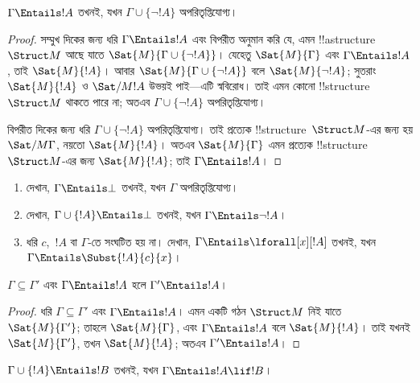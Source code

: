\documentclass[../../../include/open-logic-section]{subfiles}
\begin{document}
\begin{prop}
$\Gamma \Entails !A$ তখনই, যখন $\Gamma \cup \{\lnot !A\}$
অপরিতৃপ্তিযোগ্য।
\end{prop}

\begin{proof}
সম্মুখ দিকের জন্য ধরি $\Gamma \Entails !A$ এবং বিপরীত অনুমান করি যে,
এমন !!a{structure}~$\Struct M$ আছে যাতে $\Sat{M}{\Gamma
  \cup \{ \lnot !A \}}$। যেহেতু $\Sat{M}{\Gamma}$ এবং
$\Gamma \Entails !A$, তাই $\Sat{M}{!A}$। আবার
$\Sat{M}{\Gamma\cup \{ \lnot !A \}}$ বলে $\Sat{M}{\lnot !A}$;
সুতরাং $\Sat{M}{!A}$ ও $\Sat/{M}{!A}$ উভয়ই পাই—এটি স্ববিরোধ। তাই
এমন কোনো !!{structure}~$\Struct M$ থাকতে পারে না; অতএব
$\Gamma \cup \{ \lnot !A \}$ অপরিতৃপ্তিযোগ্য।

বিপরীত দিকের জন্য ধরি $\Gamma \cup \{ \lnot !A \}$
অপরিতৃপ্তিযোগ্য। তাই প্রত্যেক !!{structure}~$\Struct M$-এর জন্য হয়
$\Sat/{M}{\Gamma}$, নয়তো $\Sat{M}{!A}$। অতএব $\Sat{M}{\Gamma}$ এমন
প্রত্যেক !!{structure}~$\Struct M$-এর জন্য $\Sat{M}{!A}$; তাই
$\Gamma \Entails !A$।
\end{proof}

\begin{prob}
\begin{enumerate}
\item দেখান, $\Gamma \Entails \bot$ তখনই, যখন $\Gamma$ অপরিতৃপ্তিযোগ্য।
\item দেখান, $\Gamma \cup \{!A\} \Entails \bot$ তখনই, যখন
  $\Gamma \Entails \lnot !A$।
\item ধরি $c$,~$!A$ বা $\Gamma$-তে সংঘটিত হয় না। দেখান,
  $\Gamma \Entails \lforall[x][!A]$ তখনই, যখন $\Gamma \Entails
  \Subst{!A}{c}{x}$।
\end{enumerate}
\end{prob}

\begin{prop}
$\Gamma \subseteq \Gamma'$ এবং $\Gamma \Entails !A$ হলে
$\Gamma' \Entails !A$।
\end{prop}

\begin{proof}
ধরি $\Gamma \subseteq \Gamma'$ এবং $\Gamma \Entails !A$। এমন একটি
গঠন $\Struct M$ নিই যাতে $\Sat{M}{\Gamma'}$; তাহলে
$\Sat{M}{\Gamma}$, এবং $\Gamma \Entails !A$ বলে $\Sat{M}{!A}$। তাই
যখনই $\Sat{M}{\Gamma'}$, তখন $\Sat{M}{!A}$; অতএব
$\Gamma' \Entails !A$।
\end{proof}


\begin{thm}
$\Gamma \cup \{!A\} \Entails !B$ তখনই, যখন
$\Gamma \Entails !A \lif !B$।
\end{thm}
\end{document}
